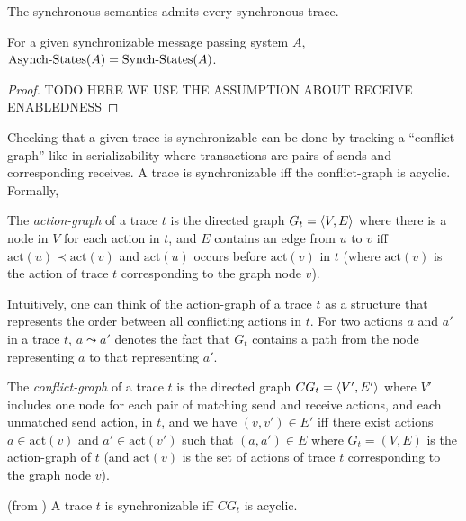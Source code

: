 \begin{lemma}\label{lem:sync_traces}
The synchronous semantics admits every synchronous trace.
\end{lemma}

\begin{lemma}
For a given synchronizable message passing system $A$, $\mathrm{Asynch}\text{-}\mathrm{States}(A)=\mathrm{Synch}\text{-}\mathrm{States}(A)$.
\end{lemma}
\begin{proof}
TODO HERE WE USE THE ASSUMPTION ABOUT RECEIVE ENABLEDNESS
\end{proof}

Checking that a given trace is synchronizable can be done by tracking a ``conflict-graph'' like in serializability 
where transactions are pairs of sends and corresponding receives. 
A trace is synchronizable if{f} the conflict-graph is acyclic. Formally,

\begin{definition}\label{def:pr_graphs}
    The \emph{action-graph} of a trace $t$ is the directed graph 
    $G_t = \left\langle {V,E} \right\rangle$ where there is a node in $V$ for each action in $t$, and $E$ 
    contains an edge from $u$ to $v$ iff $\mathrm{act}(u) \prec \mathrm{act}(v)$ and $\mathrm{act}(u)$ occurs before $\mathrm{act}(v)$ in $t$ (where $\mathrm{act}(v)$ is the action of trace $t$ corresponding to the graph node $v$).
\end{definition}
Intuitively, one can think of the action-graph of a trace $t$ as a structure that represents the order between all conflicting actions in $t$.
For two actions $a$ and $a'$ in a trace $t$, $a\leadsto a'$ denotes the fact that $G_t$ contains a path from the node representing $a$ to that representing $a'$.

\begin{definition}\label{def:conf_graph}
    The \emph{conflict-graph} of a trace $t$ is the directed graph $CG_t=\left\langle {V',E'} \right\rangle$ where $V'$ includes one node for each pair of matching send and receive actions, and each unmatched send action, in $t$, and we have $(v,v') \in E'$ iff there exist actions $a \in \mathrm{act}(v)$ and $a' \in \mathrm{act}(v')$ such that $(a,a') \in E$ where $G_t = (V,E)$ is the action-graph of $t$ (and $\mathrm{act}(v)$ is the set of actions of trace $t$ corresponding to the graph node $v$).
\end{definition}



\begin{theorem}\label{thm:cg} (from \citep{journals/jacm/Papadimitriou79b})
A trace $t$ is synchronizable if{f} $CG_t$ is acyclic.
\end{theorem}



